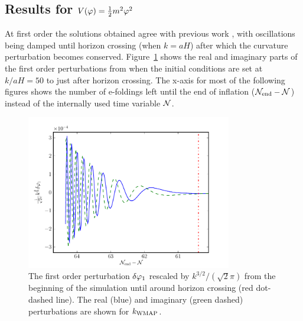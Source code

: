 \subsection{Results for \texorpdfstring{$V(\varphi)=\frac{1}{2} m^2 \varphi^2$}{m-squared model}}
\label{sec:msqphisq-res}

At first order the solutions obtained agree with previous work
\cite{Salopek:1988qh,Martin:2006rs,Ringeval:2007am}, with oscillations
being damped until horizon crossing (when $k=aH$) after which the
curvature perturbation becomes conserved. Figure~\ref{fig:dp1} shows
the real and imaginary parts of the first order perturbations from
when the initial conditions are set at $k/aH=50$ to just after horizon
crossing. The x-axis for most of the following figures shows the
number of e-foldings left until the end of inflation ($\mathcal{N}_\mathrm{end}-\mathcal{N}$) instead
of the internally used time variable $\mathcal{N}$.
%
% 
\begin{figure}
 \centering
 \includegraphics[width=0.8\textwidth]{numerical/graphs/dp1_kwmap}
 \caption[First Order Perturbation]{The first order perturbation $\delta\varphi_{1}$ rescaled by
$k^{3/2}/(\sqrt{2}\pi)$ from the beginning of the simulation until around
horizon crossing (red dot-dashed line). The real (blue) and imaginary (green
dashed) perturbations are shown for $k_\mathrm{WMAP}$.}
\label{fig:dp1}
\end{figure}
% 



